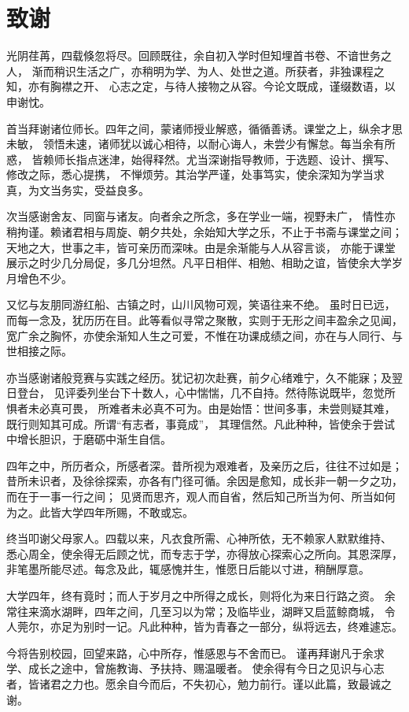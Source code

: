 ﻿%
\chapter*{致\quad 谢}

光阴荏苒，四载倏忽将尽。回顾既往，余自初入学时但知埋首书卷、不谙世务之人，
渐而稍识生活之广，亦稍明为学、为人、处世之道。所获者，非独课程之知，亦有胸襟之开、
心志之定，与待人接物之从容。今论文既成，谨缀数语，以申谢忱。

首当拜谢诸位师长。四年之间，蒙诸师授业解惑，循循善诱。课堂之上，纵余才思未敏，
领悟未速，诸师犹以诚心相待，以耐心诲人，未尝少有懈怠。每当余有所惑，
皆赖师长指点迷津，始得释然。尤当深谢指导教师，于选题、设计、撰写、修改之际，悉心提携，
不惮烦劳。其治学严谨，处事笃实，使余深知为学当求真，为文当务实，受益良多。

次当感谢舍友、同窗与诸友。向者余之所念，多在学业一端，视野未广，
情性亦稍拘谨。赖诸君相与周旋、朝夕共处，余始知大学之乐，不止于书斋与课堂之间；
天地之大，世事之丰，皆可亲历而深味。由是余渐能与人从容言谈，
亦能于课堂展示之时少几分局促，多几分坦然。凡平日相伴、相勉、相助之谊，皆使余大学岁月增色不少。

又忆与友朋同游红船、古镇之时，山川风物可观，笑语往来不绝。
虽时日已远，而每一念及，犹历历在目。此等看似寻常之聚散，实则于无形之间丰盈余之见闻，
宽广余之胸怀，亦使余渐知人生之可爱，不惟在功课成绩之间，亦在与人同行、与世相接之际。

亦当感谢诸般竞赛与实践之经历。犹记初次赴赛，前夕心绪难宁，久不能寐；及翌日登台，
见评委列坐台下十数人，心中惴惴，几不自持。然待陈说既毕，忽觉所惧者未必真可畏，
所难者未必真不可为。由是始悟：世间多事，未尝则疑其难，既行则知其可成。所谓“有志者，事竟成”，
其理信然。凡此种种，皆使余于尝试中增长胆识，于磨砺中渐生自信。

四年之中，所历者众，所感者深。昔所视为艰难者，及亲历之后，往往不过如是；
昔所未识者，及徐徐探索，亦各有门径可循。余因是愈知，成长非一朝一夕之功，而在于一事一行之间；
见贤而思齐，观人而自省，然后知己所当为何、所当如何为之。此皆大学四年所赐，不敢或忘。

终当叩谢父母家人。四载以来，凡衣食所需、心神所依，无不赖家人默默维持、
悉心周全，使余得无后顾之忧，而专志于学，亦得放心探索心之所向。其恩深厚，
非笔墨所能尽述。每念及此，辄感愧并生，惟愿日后能以寸进，稍酬厚意。

大学四年，终有竟时；而人于岁月之中所得之成长，则将化为来日行路之资。
余常往来滴水湖畔，四年之间，几至习以为常；及临毕业，湖畔又启蓝鲸商城，
令人莞尔，亦足为别时一记。凡此种种，皆为青春之一部分，纵将远去，终难遽忘。

今将告别校园，回望来路，心中所存，惟感恩与不舍而已。
谨再拜谢凡于余求学、成长之途中，曾施教诲、予扶持、赐温暖者。
使余得有今日之见识与心志者，皆诸君之力也。愿余自今而后，不失初心，勉力前行。谨以此篇，致最诚之谢。

\newpage



